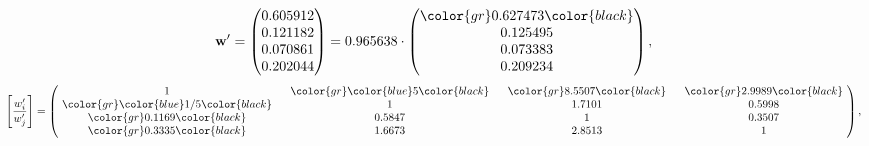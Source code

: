 \begin{example}
\begin{equation*}
\mathbf{w}^{\prime} =
\begin{pmatrix}
0.605912\\
0.121182\\
0.070861\\
0.202044
\end{pmatrix} =
0.965638\cdot
\begin{pmatrix}
\color{gr} 0.627473\color{black} \\
0.125495\\
0.073383\\
0.209234
\end{pmatrix},
\end{equation*}
\begin{equation*}
\left[ \frac{{w}^{\prime}_i}{{w}^{\prime}_j} \right] =
\begin{pmatrix}
$\,\,$ 1 $\,\,$ & $\,\,$\color{gr} \color{blue} 5\color{black} $\,\,$ & $\,\,$\color{gr} 8.5507\color{black} $\,\,$ & $\,\,$\color{gr} 2.9989\color{black} $\,\,$ \\
$\,\,$\color{gr} \color{blue}  1/5\color{black} $\,\,$ & $\,\,$ 1 $\,\,$ & $\,\,$1.7101$\,\,$ & $\,\,$0.5998  $\,\,$ \\
$\,\,$\color{gr} 0.1169\color{black} $\,\,$ & $\,\,$0.5847$\,\,$ & $\,\,$ 1 $\,\,$ & $\,\,$0.3507 $\,\,$ \\
$\,\,$\color{gr} 0.3335\color{black} $\,\,$ & $\,\,$1.6673$\,\,$ & $\,\,$2.8513$\,\,$ & $\,\,$ 1  $\,\,$ \\
\end{pmatrix},
\end{equation*}
\end{example}
\newpage
